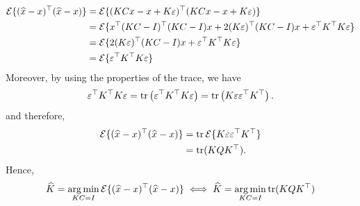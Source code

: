     \begin{align*}
\mathcal{E}\{(\widehat{x} - x)^\top (\widehat{x} -x)\}& =\mathcal{E}\{(KCx-x+K\varepsilon)^\top (KCx-x+K\varepsilon)\}\\
        & =\mathcal{E}\{x^\top(KC - I)^\top(KC-I)x+2(K\varepsilon)^\top(KC-I)x+\varepsilon^\top  K^\top  K \varepsilon\} \\
         & =\mathcal{E}\{2(K\varepsilon)^\top(KC-I)x+\varepsilon^\top  K^\top  K \varepsilon\}\\
         &= \mathcal{E}\{ \varepsilon^\top  K^\top  K \varepsilon\}
    \end{align*}
Moreover, by using the properties of the trace, we have
    \begin{equation*}
        \varepsilon^\top K^\top K\varepsilon= \operatorname*{\rm tr}\left( \varepsilon^\top K^\top K\varepsilon \right)=\operatorname*{\rm tr}\left(K\varepsilon\varepsilon^\top K^\top\right).
    \end{equation*}
    and therefore,
    \begin{align*}
\mathcal{E}\{(\widehat{x} - x)^\top (\widehat{x} -x)\}&=\operatorname*{\rm tr}\mathcal{E}\{K\varepsilon\varepsilon^\top K^\top\}\\
        &=\operatorname*{\rm tr}(KQK^\top ).
    \end{align*}
Hence, 
$$ 
  \widehat{K}=\operatorname*{arg\,min}_{KC = I}  \mathcal{E}\{(\widehat{x} - x)^\top (\widehat{x} -x)\} \iff     \widehat{K}=\operatorname*{arg\,min}_{KC = I}  \operatorname*{\rm tr}(KQK^\top) 
$$

